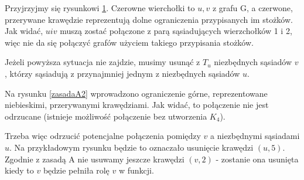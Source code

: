 Przyjrzyjmy się rysunkowi \ref{zasadaA1}. Czerowne wierchołki to $u, v$ z grafu G, 
a czerwone, przerywane krawędzie reprezentują dolne ograniczenia przypisanych im stożków.
Jak widać, $u i v$ muszą zostać połączone z parą sąsiadujących wierzchołków 1 i 2, więc nie 
da się połączyć grafów użyciem takiego przypisania stożków. 
\begin{figure}[H]
  \centering
 \caption{}
 \label{zasadaA1}
 \end{figure}

 Jeżeli powyższa sytuacja nie zajdzie, musimy usunąć z $T_u$ niezbędnych sąsiadów $v$, 
 którzy sąsiadują z przynajmniej jednym z niezbędnych sąsiadów $u$. 
 
  Na rysunku \ref{zasadaA2} wprowadzono ograniczenie górne, reprezentowane niebieskimi, 
  przerywanymi krawędziami.  Jak widać, to połączenie nie jest odrzucane (istnieje możliwość połączenie bez utworzenia $K_4$).
    
  Trzeba więc odrzucić potencjalne połączenia pomiędzy $v$ a niezbędnymi sąsiadami $u$. 
  Na przykładowym rysunku będzie to oznaczało usunięcie krawędzi $(u, 5)$. Zgodnie z zasadą A nie usuwamy jeszcze krawędzi 
  $(v,2)$ - zostanie ona usunięta kiedy to $v$ będzie pełniła rolę $v$ w funkcji.  

